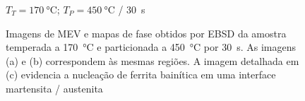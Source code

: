 \begin{figure}
  \centering
  $T_T = \SI{170}{\degreeCelsius}$; $T_P = \SI{450}{\degreeCelsius}$ / \SI{30}{s}\\
  \quad
  \vspace{0pt}
  \quad
  \caption{Imagens de MEV e mapas de fase obtidos por EBSD da amostra temperada a \SI{170}{\degreeCelsius} e particionada a \SI{450}{\degreeCelsius} por 30~s. As imagens (a) e (b) correspondem às mesmas regiões. A imagem detalhada em (c) evidencia a nucleação de ferrita bainítica em uma interface martensita / austenita}
  \label{fig:TP450-30s_MEV}
\end{figure}

